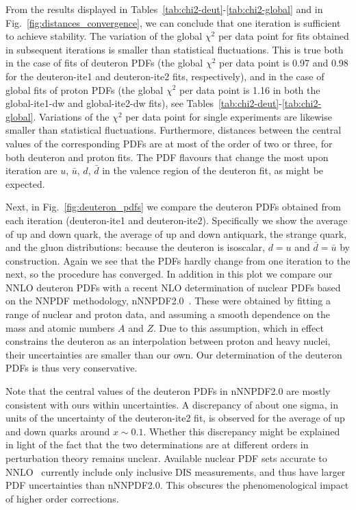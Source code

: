 \documentclass[11pt,a4paper]{article}
\begin{document}
From the results displayed in Tables~\ref{tab:chi2-deut}-\ref{tab:chi2-global}
and in Fig.~\ref{fig:distances_convergence}, we can conclude that one iteration
is sufficient to achieve stability. The variation of the global $\chi^2$ per
data point for fits obtained in subsequent iterations is smaller than
statistical fluctuations. This is true both in the case of fits of deuteron PDFs
(the global $\chi^2$ per data point is 0.97 and 0.98 for the deuteron-ite1 and
deuteron-ite2 fits, respectively), and in the case of global fits of proton
PDFs (the global $\chi^2$ per data point is 1.16 in both the global-ite1-dw and
global-ite2-dw fits), see Tables~\ref{tab:chi2-deut}-\ref{tab:chi2-global}.
Variations of the $\chi^2$ per data point for single experiments are likewise
smaller than statistical fluctuations. Furthermore, distances between the
central values of the corresponding PDFs are at most of the order of two or
three, for both deuteron and proton fits. The PDF flavours that change the most
upon iteration are $u$, $\bar{u}$, $d$, $\bar{d}$ in the valence region of the
deuteron fit, as might be expected. 

Next, in Fig.~\ref{fig:deuteron_pdfs} we compare the
deuteron PDFs obtained from each iteration (deuteron-ite1 and deuteron-ite2).
Specifically we show the average of up and down quark, the average of up
and down antiquark, the strange quark, and the gluon
distributions: because the deuteron is isoscalar, $d=u$ and $\bar{d}=\bar{u}$
by construction. Again we see that the PDFs hardly
change from one iteration to the next, so the procedure has converged.
In addition in this plot we compare our NNLO deuteron PDFs with a recent NLO
determination of nuclear PDFs based on the NNPDF methodology,
nNNPDF2.0~\cite{AbdulKhalek:2020yuc}. These were obtained by 
fitting a range of nuclear and proton data, and assuming a smooth dependence
on the mass and atomic numbers $A$ and $Z$. Due to this assumption, 
which in effect constrains the deuteron as an interpolation between proton and
heavy nuclei, their uncertainties are smaller than our own.
Our determination of the deuteron PDFs is thus very conservative.

Note that the central values of the deuteron PDFs in nNNPDF2.0 are mostly
consistent with ours within 
uncertainties. A discrepancy of about one sigma, in units of the uncertainty of
the deuteron-ite2 fit, is observed for the average of up and down quarks
around $x\sim 0.1$. Whether this discrepancy might be explained in light of the
fact that the two determinations are at different orders in perturbation
theory remains unclear. Available nuclear PDF sets accurate to
NNLO~\cite{AbdulKhalek:2019mzd,Walt:2019slu} currently include only inclusive
DIS measurements, and thus have larger PDF uncertainties than nNNPDF2.0.
This obscures the phenomenological impact of higher order corrections.
\end{document}
